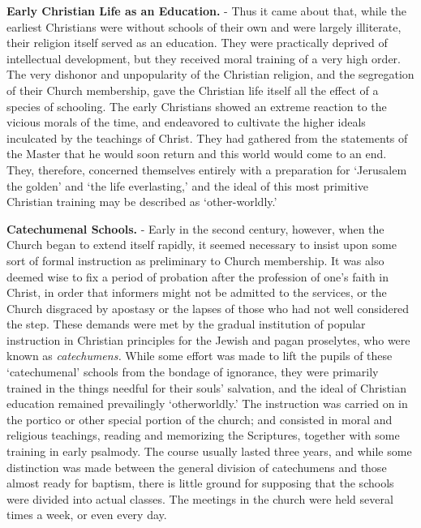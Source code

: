 \documentclass[]{book}
\begin{document}
\textbf{Early Christian Life as an Education.} - Thus it came about that, while the earliest Christians were without schools of their own and were largely illiterate, their religion itself served as an education. They were practically deprived of intellectual development, but they received moral training of a very high order. The very dishonor and unpopularity of the Christian religion, and the segregation of their Church membership, gave the Christian life itself all the effect of a species of schooling. The early Christians showed an extreme reaction to the vicious morals of the time, and endeavored to cultivate the higher ideals inculcated by the teachings of Christ. They had gathered from the statements of the Master that he would soon return and this world would come to an end. They, therefore, concerned themselves entirely with a preparation for `Jerusalem the golden' and `the life everlasting,' and the ideal of this most primitive Christian training may be described as `other-worldly.'

\textbf{Catechumenal Schools.} - Early in the second century, however, when the Church began to extend itself rapidly, it seemed necessary to insist upon some sort of formal instruction as preliminary to Church membership. It was also deemed wise to fix a period of probation after the profession of one's faith in Christ, in order that informers might not be admitted to the services, or the Church disgraced by apostasy or the lapses of those who had not well considered the step. These demands were met by the gradual institution of popular instruction in Christian principles for the Jewish and pagan proselytes, who were known as \emph{catechumens.} While some effort was made to lift the pupils of these `catechumenal' schools from the bondage of ignorance, they were primarily trained in the things needful for their souls' salvation, and the ideal of Christian education remained prevailingly `otherworldly.' The instruction was carried on in the portico or other special portion of the church; and consisted in moral and religious teachings, reading and memorizing the Scriptures, together with some training in early psalmody. The course usually lasted three years, and while some distinction was made between the general division of catechumens and those almost ready for baptism, there is little ground for supposing that the schools were divided into actual classes. The meetings in the church were held several times a week, or even every day.
\end{document}
